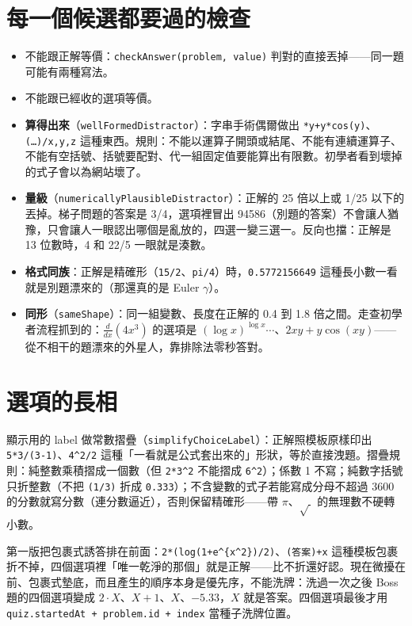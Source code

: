 \documentclass[11pt,a4paper,oneside]{book}
\renewcommand{\_}{\ifmmode\origunderscore\else\textunderscore\allowbreak\fi}
\newcommand{\code}[1]{\texttt{#1}}
\begin{document}
\section{每一個候選都要過的檢查}
\begin{itemize}
  \item 不能跟正解等價：\code{checkAnswer(problem, value)} 判對的直接丟掉——同一題可能有兩種寫法。
  \item 不能跟已經收的選項等價。
  \item \textbf{算得出來}（\code{wellFormedDistractor}）：字串手術偶爾做出 \code{*y+y*cos(y)}、\code{(…)/x,y,z} 這種東西。規則：不能以運算子開頭或結尾、不能有連續運算子、不能有空括號、括號要配對、代一組固定值要能算出有限數。初學者看到壞掉的式子會以為網站壞了。
  \item \textbf{量級}（\code{numericallyPlausibleDistractor}）：正解的 25 倍以上或 1/25 以下的丟掉。梯子問題的答案是 3/4，選項裡冒出 94586（別題的答案）不會讓人猶豫，只會讓人一眼認出哪個是亂放的，四選一變三選一。反向也擋：正解是 13 位數時，4 和 22/5 一眼就是湊數。
  \item \textbf{格式同族}：正解是精確形（\code{15/2}、\code{pi/4}）時，\code{0.5772156649} 這種長小數一看就是別題漂來的（那還真的是 Euler $\gamma$）。
  \item \textbf{同形}（\code{sameShape}）：同一組變數、長度在正解的 0.4 到 1.8 倍之間。走查初學者流程抓到的：$\frac{d}{dx}(4x^3)$ 的選項是 $(\log x)^{\log x}\cdots$、$2xy + y\cos(xy)$——從不相干的題漂來的外星人，靠排除法零秒答對。
\end{itemize}

\section{選項的長相}
顯示用的 label 做常數摺疊（\code{simplifyChoiceLabel}）：正解照模板原樣印出 \code{5*3/(3-1)}、\code{4\string^2/2} 這種「一看就是公式套出來的」形狀，等於直接洩題。摺疊規則：純整數乘積摺成一個數（但 \code{2*3\string^2} 不能摺成 \code{6\string^2}）；係數 1 不寫；純數字括號只折整數（不把 \code{(1/3)} 折成 \code{0.333}）；不含變數的式子若能寫成分母不超過 3600 的分數就寫分數（連分數逼近），否則保留精確形——帶 $\pi$、$\sqrt{\ }$ 的無理數不硬轉小數。

\begin{pitfall}[反向洩題]
第一版把包裹式誘答排在前面：\code{2*(log(1+e\string^\{x\string^2\})/2)}、\code{(答案)+x} 這種模板包裹折不掉，四個選項裡「唯一乾淨的那個」就是正解——比不折還好認。現在微擾在前、包裹式墊底，而且產生的順序本身是優先序，不能洗牌：洗過一次之後 Boss 題的四個選項變成 $2\cdot X$、$X+1$、$X$、$-5.33$，$X$ 就是答案。四個選項最後才用 \code{quiz.startedAt + problem.id + index} 當種子洗牌位置。
\end{pitfall}
\end{document}
